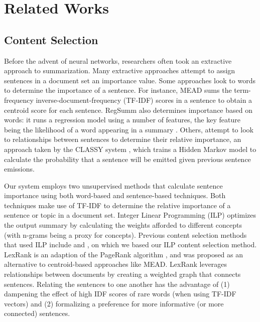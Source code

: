 \section{Related Works}


\subsection{Content Selection}

Before the advent of neural networks, researchers often took an extractive approach to summarization. Many extractive approaches attempt to assign sentences in a document set an importance value. Some approaches look to words to determine the importance of a sentence. For instance, MEAD \cite{radev-etal-2000-centroid} sums the term-frequency inverse-document-frequency (TF-IDF) scores in a sentence to obtain a centroid score for each sentence. RegSumm also determines importance based on words: it runs a regression model using a number of features, the key feature being the likelihood of a word appearing in a summary \cite{hong-nenkova-2014-improving}. Others, attempt to look to relationships between sentences to determine their relative importance, an approach taken by the CLASSY system \cite{conroy2005classy}, which trains a Hidden Markov model to calculate the probability that a sentence will be emitted given previous sentence emissions.

Our system employs two unsupervised methods that calculate sentence importance using both word-based and sentence-based techniques. Both techniques make use of TF-IDF to determine the relative importance of a sentence or topic in a document set. Integer Linear Programming (ILP) optimizes the output summary by calculating the weights afforded to different concepts (with n-grams being a proxy for concepts). Previous content selection methods that used ILP include \citep{Gillick_2008_ILP} and \citep{luo_liu_liu_litman_2018}, on which we based our ILP content selection method. LexRank is an adaption of the PageRank algorithm \cite{pagerank}, and was proposed as an alternative to centroid-based approaches like MEAD. LexRank leverages relationships between documents by creating a weighted graph that connects sentences. Relating the sentences to one another has the advantage of (1) dampening the effect of high IDF scores of rare words (when using TF-IDF vectors) and (2) formalizing a preference for more informative (or more connected) sentences.

